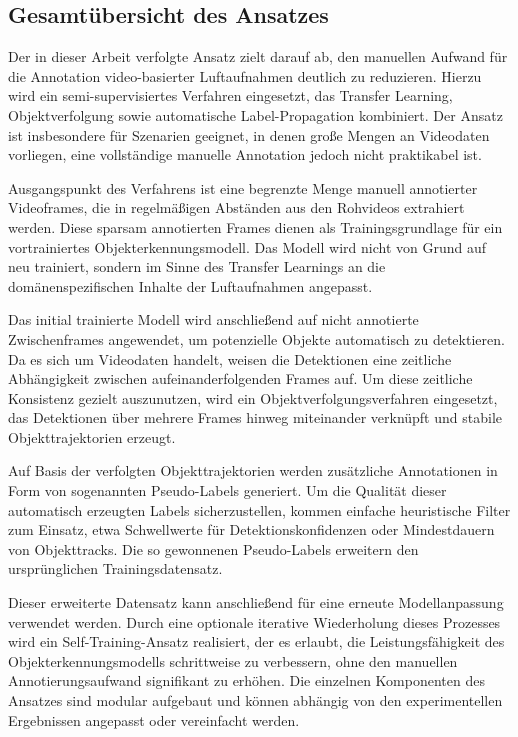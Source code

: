 \subsection{Gesamtübersicht des Ansatzes}

Der in dieser Arbeit verfolgte Ansatz zielt darauf ab, den manuellen Aufwand für die
Annotation video-basierter Luftaufnahmen deutlich zu reduzieren. Hierzu wird ein
semi-supervisiertes Verfahren eingesetzt, das Transfer Learning, Objektverfolgung
sowie automatische Label-Propagation kombiniert. Der Ansatz ist insbesondere für
Szenarien geeignet, in denen große Mengen an Videodaten vorliegen, eine vollständige
manuelle Annotation jedoch nicht praktikabel ist.

Ausgangspunkt des Verfahrens ist eine begrenzte Menge manuell annotierter Videoframes,
die in regelmäßigen Abständen aus den Rohvideos extrahiert werden. Diese sparsam
annotierten Frames dienen als Trainingsgrundlage für ein vortrainiertes
Objekterkennungsmodell. Das Modell wird nicht von Grund auf neu trainiert, sondern im
Sinne des Transfer Learnings an die domänenspezifischen Inhalte der Luftaufnahmen
angepasst.

Das initial trainierte Modell wird anschließend auf nicht annotierte Zwischenframes
angewendet, um potenzielle Objekte automatisch zu detektieren. Da es sich um
Videodaten handelt, weisen die Detektionen eine zeitliche Abhängigkeit zwischen
aufeinanderfolgenden Frames auf. Um diese zeitliche Konsistenz gezielt auszunutzen,
wird ein Objektverfolgungsverfahren eingesetzt, das Detektionen über mehrere Frames
hinweg miteinander verknüpft und stabile Objekttrajektorien erzeugt.

Auf Basis der verfolgten Objekttrajektorien werden zusätzliche Annotationen in Form
von sogenannten Pseudo-Labels generiert. Um die Qualität dieser automatisch erzeugten
Labels sicherzustellen, kommen einfache heuristische Filter zum Einsatz, etwa
Schwellwerte für Detektionskonfidenzen oder Mindestdauern von Objekttracks. Die so
gewonnenen Pseudo-Labels erweitern den ursprünglichen Trainingsdatensatz.

Dieser erweiterte Datensatz kann anschließend für eine erneute Modellanpassung
verwendet werden. Durch eine optionale iterative Wiederholung dieses Prozesses wird
ein Self-Training-Ansatz realisiert, der es erlaubt, die Leistungsfähigkeit des
Objekterkennungsmodells schrittweise zu verbessern, ohne den manuellen
Annotierungsaufwand signifikant zu erhöhen. Die einzelnen Komponenten des Ansatzes
sind modular aufgebaut und können abhängig von den experimentellen Ergebnissen
angepasst oder vereinfacht werden.



